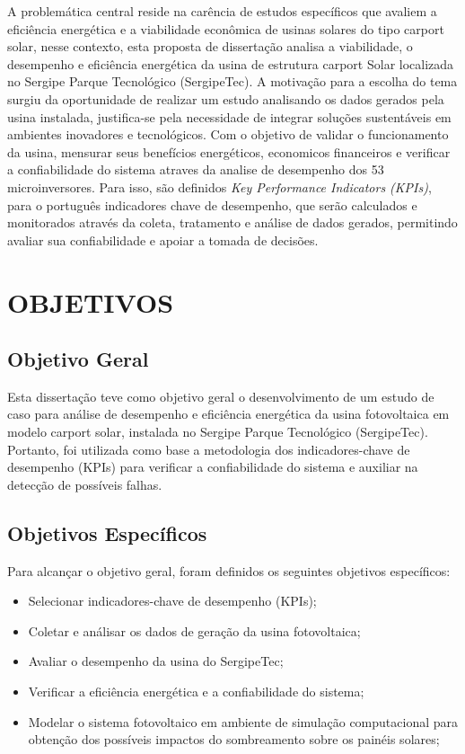 A problemática central reside na carência de estudos específicos que avaliem a eficiência energética e a viabilidade econômica de usinas solares do tipo carport solar, nesse contexto, esta proposta de dissertação analisa a viabilidade, o desempenho e eficiência energética da usina de estrutura carport Solar localizada no Sergipe Parque Tecnológico (SergipeTec). A motivação para a escolha do tema surgiu da oportunidade de realizar um estudo analisando os dados gerados pela usina instalada, justifica-se pela necessidade de integrar soluções sustentáveis em ambientes inovadores e tecnológicos. Com o objetivo de validar o funcionamento da usina, mensurar seus benefícios energéticos, economicos financeiros e verificar a confiabilidade do sistema atraves da analise de desempenho dos 53 microinversores. Para isso, são definidos \textit{Key Performance Indicators (KPIs)}, para o português indicadores chave de desempenho, que serão calculados e monitorados através da coleta, tratamento e análise de dados gerados, permitindo avaliar sua confiabilidade e apoiar a tomada de decisões.

\section{OBJETIVOS}
\label{objetivos}


\subsection{Objetivo Geral}



Esta dissertação teve como objetivo geral o desenvolvimento de um estudo de caso para análise de desempenho e eficiência energética da usina fotovoltaica em modelo carport solar, instalada no Sergipe Parque Tecnológico (SergipeTec). Portanto, foi utilizada como base a metodologia dos indicadores-chave de desempenho (KPIs) para verificar a confiabilidade do sistema e auxiliar na detecção de possíveis falhas.

\subsection{Objetivos Específicos}

Para alcançar o objetivo geral, foram definidos os seguintes objetivos específicos:

\begin{itemize}
    
    \item Selecionar indicadores-chave de desempenho (KPIs);
    \item Coletar e análisar os dados de geração da usina fotovoltaica;
    \item Avaliar o desempenho da usina do SergipeTec;
    \item Verificar a eficiência energética e a confiabilidade do sistema;
    \item Modelar o sistema fotovoltaico em ambiente de simulação computacional para obtenção dos possíveis impactos do sombreamento sobre os painéis solares;

    
\end{itemize}

